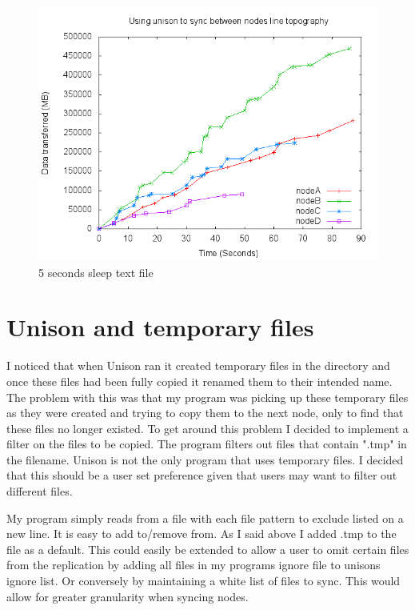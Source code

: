 \documentclass[12pt]{article}
\begin{document}
\begin{figure}[htp]
    \centering
    \includegraphics[scale=0.5]{images/5sleep-bad.png}
    \caption{5 seconds sleep text file}
    \label{fig:5sleep_graph}
\end{figure}
\newpage

\section{Unison and temporary files}
I noticed that when Unison ran it created temporary files in the
directory and once these files had been fully copied it renamed
them to their intended name. The problem with this was that my program
was picking up these temporary files as they were created and trying to
copy them to the next node, only to find that these files no longer existed.
To get around this problem I decided to implement a filter on the files to
be copied. The program filters out files that contain ".tmp" in the filename.
Unison is not the only program that uses temporary files. I decided that this
should be a user set preference given that users may want to filter out different
files.

My program simply reads from a file with each file pattern to exclude
listed on a new line. It is easy to add to/remove from. As I said above
I added .tmp to the file as a default. This could easily be extended
to allow a user to omit certain files from the replication by adding
all files in my programs ignore file to unisons ignore list. Or conversely
by maintaining a white list of files to sync. This would allow for
greater granularity when syncing nodes.
\end{document}

